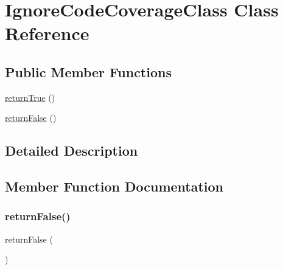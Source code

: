 \hypertarget{class_ignore_code_coverage_class}{}\section{Ignore\+Code\+Coverage\+Class Class Reference}
\label{class_ignore_code_coverage_class}
\subsection*{Public Member Functions}
\begin{DoxyCompactItemize}
\item 
\mbox{\hyperlink{class_ignore_code_coverage_class_aadfc19ed04831b45595f228ce5ca1463}{return\+True}} ()
\item 
\mbox{\hyperlink{class_ignore_code_coverage_class_a6dfcb88f86140050184a3f74f5ade2d1}{return\+False}} ()
\end{DoxyCompactItemize}


\subsection{Detailed Description}


\subsection{Member Function Documentation}
\mbox{\label{class_ignore_code_coverage_class_a6dfcb88f86140050184a3f74f5ade2d1}} 
\subsubsection{\texorpdfstring{return\+False()}{returnFalse()}}
{\footnotesize\ttfamily return\+False (\begin{DoxyParamCaption}{ }\end{DoxyParamCaption})}

\mbox{\label{class_ignore_code_coverage_class_aadfc19ed04831b45595f228ce5ca1463}} 
